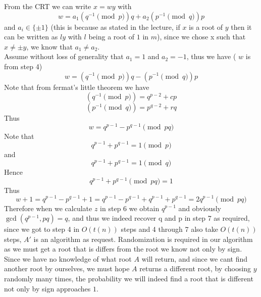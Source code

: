 \documentclass{article}
\begin{document}
From the CRT we can write $x = wy$ with 
\[w = a_1(q^{-1} \pmod p)q + a_2(p^{-1} \pmod q)p\]
and $a_i \in \{\pm 1\}$ (this is because as stated in the lecture, if $x$ is a root of $y$ then it can be written as $ly$ with $l$ being a root of $1$ in $m$), since we chose x such that $x \neq \pm y$, we know that $a_1 \neq a_2$.\\
Assume without loss of generality that $a_1 = 1$ and  $a_2 = -1$, thus we have ( $w$ is from step 4)
\[w = (q^{-1} \pmod p)q - (p^{-1} \pmod q)p \]
Note that from fermat's little theorem we have 
\[(q^{-1} \pmod p)= q^{p-2} + cp\]
\[(p^{-1} \pmod q)= p^{q-2} + rq\]
Thus 
\[w = q^{p-1} - p^{q-1} \pmod {pq}\]
Note that 
\[q^{p-1} + p^{q-1} = 1 \pmod p\]
and
\[q^{p-1} + p^{q-1}  = 1 \pmod q\]
Hence
\[q^{p-1} + p^{q-1} \pmod {pq} = 1\]
Thus
\[w + 1 = q^{p-1} - p^{q-1} + 1  = q^{p-1} - p^{q-1} + q^{p-1} + p^{q-1} = 2q^{p-1} \pmod {pq}\]
Therefore when we calculate $z$ in step 6 we obtain $q^{p-1}$ and obviously $\gcd(q^{p-1}, pq) = q$, and thus we indeed recover q and p in step 7 as required, since we got to step 4 in $O(t(n))$ steps and 4 through 7 also take $O(t(n))$ steps, $A'$ is an algorithm as request.
Randomization is required in our algorithm as we must get a root that is differs from the root we know not only by sign. Since we have no knowledge of what root $A$ will return, and since we cant find another root by ourselves, we must hope $A$ returns a different root, by choosing $y$ randomly many times, the probability we will indeed find a root that is different not only by sign approaches $1$.
 

\section{} %

\section{} %

\section{} %
\end{document}
